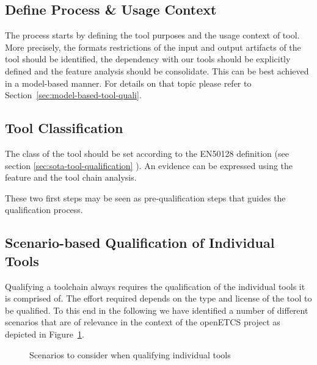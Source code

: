 \subsection{Define Process \& Usage Context}
The process starts by defining the tool purposes and the usage context
of tool. More precisely, the formats restrictions of the input and
output artifacts  of the tool should be identified, the dependency with
our tools should be explicitly defined and the feature analysis should
be consolidate. This can be best achieved in a model-based manner.
For details on that topic please refer to
Section~\ref{sec:model-based-tool-quali}.

\subsection{Tool Classification}
The class of the tool should be set according to the EN50128
definition (see section \ref{sec:sota-tool-qualification} ). An evidence can be expressed using the feature and
the tool chain analysis.


These two first steps may be seen as pre-qualification steps that
guides the qualification process.

\subsection{Scenario-based Qualification of Individual Tools}
\label{sec:scenario-based-tool-quali}


Qualifying a toolchain always requires the qualification of the individual tools it is comprised of. The effort required depends on the type and license of the tool to be qualified. To this end in the following we have identified a number of different scenarios that are of relevance in the context of the openETCS project as depicted in Figure~\ref{fig:tool-qualification-scenarios}.

\begin{figure}[htbp]
\begin{center}
\end{center}
\caption{Scenarios to consider when qualifying individual tools}
\label{fig:tool-qualification-scenarios}
\end{figure}

